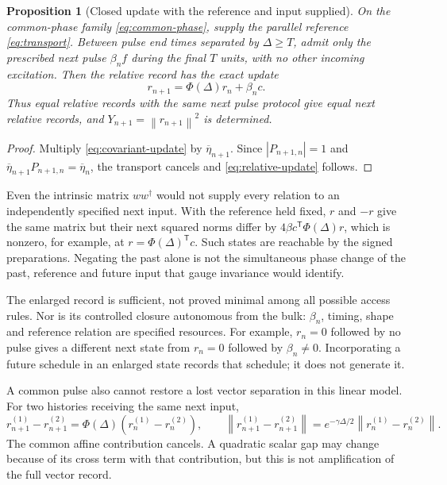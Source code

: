 \documentclass[11pt,a4paper]{article}
\newtheorem{proposition}{Proposition}[section]
\theoremstyle{remark}
\newcommand{\norm}[1]{\left\lVert#1\right\rVert}
\begin{document}
\begin{proposition}[Closed update with the reference and input supplied]
\label{prop:relative-closure}
On the common-phase family \eqref{eq:common-phase}, supply the parallel
reference \eqref{eq:transport}. Between pulse end times separated by
$\Delta\ge T$, admit only the prescribed next pulse $\beta_n f$ during
the final $T$ units, with no other incoming excitation. Then the relative
record has the exact update
\begin{equation}
 r_{n+1}=\Phi(\Delta)r_n+\beta_n c.
 \label{eq:relative-update}
\end{equation}
Thus equal relative records with the same next pulse protocol give equal
next relative records, and $Y_{n+1}=\norm{r_{n+1}}^2$ is determined.
\end{proposition}
\begin{proof}
Multiply \eqref{eq:covariant-update} by $\overline\eta_{n+1}$.
Since $|P_{n+1,n}|=1$ and
$\overline\eta_{n+1}P_{n+1,n}=\overline\eta_n$, the transport cancels
and \eqref{eq:relative-update} follows.
\end{proof}

Even the intrinsic matrix $w w^\dagger$ would not supply every relation
to an independently specified next input. With the reference held fixed,
$r$ and $-r$ give the same matrix but their next squared norms differ by
$4\beta c^{\mathsf T}\Phi(\Delta)r$, which is nonzero, for example, at
$r=\Phi(\Delta)^{\mathsf T}c$. Such states are reachable by the signed
preparations. Negating the past alone is not the simultaneous phase
change of the past, reference and future input that gauge invariance
would identify.

The enlarged record is sufficient, not proved minimal among all possible
access rules. Nor is its controlled closure autonomous from the bulk:
$\beta_n$, timing, shape and reference relation are specified resources.
For example, $r_n=0$ followed by no pulse gives a different next state
from $r_n=0$ followed by $\beta_n\ne0$. Incorporating a future schedule
in an enlarged state records that schedule; it does not generate it.

A common pulse also cannot restore a lost vector separation in this
linear model. For two histories receiving the same next input,
\begin{equation}
 r_{n+1}^{(1)}-r_{n+1}^{(2)}
  =\Phi(\Delta)(r_n^{(1)}-r_n^{(2)}),\qquad
 \norm{r_{n+1}^{(1)}-r_{n+1}^{(2)}}
  =e^{-\gamma\Delta/2}\norm{r_n^{(1)}-r_n^{(2)}}.
 \label{eq:contraction}
\end{equation}
The common affine contribution cancels. A quadratic scalar gap may
change because of its cross term with that contribution, but this is
not amplification of the full vector record.
\end{document}
